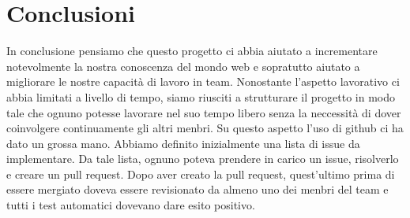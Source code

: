 \documentclass{report}
\begin{document}
\section{Conclusioni}
In conclusione pensiamo che questo progetto ci abbia aiutato a incrementare notevolmente la nostra conoscenza del mondo web
e sopratutto aiutato a migliorare le nostre capacità di lavoro in team.
Nonostante l'aspetto lavorativo ci abbia limitati a livello di tempo, siamo riusciti a strutturare il progetto in modo tale
che ognuno potesse lavorare nel suo tempo libero senza la neccessità di dover coinvolgere continuamente gli altri menbri.
Su questo aspetto l'uso di github ci ha dato un grossa mano. Abbiamo definito inizialmente una lista di issue da implementare.
Da tale lista, ognuno poteva prendere in carico un issue, risolverlo e creare un pull request. Dopo aver creato la pull request,
quest'ultimo prima di essere mergiato doveva essere revisionato da almeno uno dei menbri del team e tutti i test automatici
dovevano dare esito positivo.


%
%
\end{document}
